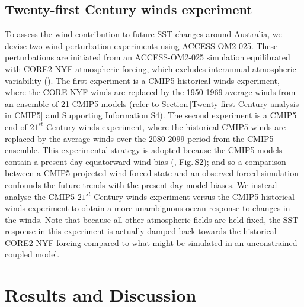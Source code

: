 \documentclass[draft,linenumbers]{agujournal2018}
\begin{document}
\subsection{Twenty-first Century winds experiment} \label{Twenty-first Century winds experiment}
To assess the wind contribution to future SST changes around Australia, we devise two wind perturbation experiments using ACCESS-OM2-025. These perturbations are initiated from an ACCESS-OM2-025 simulation equilibrated with CORE2-NYF atmospheric forcing, which excludes interannual atmospheric variability (\citealp{Large2009}). The first experiment is a CMIP5 historical winds experiment, where the CORE-NYF winds are replaced by the 1950-1969 average winds from an ensemble of 21 CMIP5 models (refer to Section\,\ref{Twenty-first Century analysis in CMIP5} and Supporting Information S4). The second experiment is a CMIP5 end of $21^{st}$ Century winds experiment, where the historical CMIP5 winds are replaced by the average winds over the 2080-2099 period from the CMIP5 ensemble. This experimental strategy is adopted because the CMIP5 models contain a present-day equatorward wind bias (\citealp{Bracegirdle2013}, Fig.\,S2); and so a comparison between a CMIP5-projected wind forced state and an observed forced simulation confounds the future trends with the present-day model biases. We instead analyse the CMIP5 $21^{st}$ Century winds experiment versus the CMIP5 historical winds experiment to obtain a more unambiguous ocean response to changes in the winds. Note that because all other atmospheric fields are held fixed, the SST response in this experiment is actually damped back towards the historical CORE2-NYF forcing compared to what might be simulated in an unconstrained coupled model.

\section{Results and Discussion}
\end{document}

